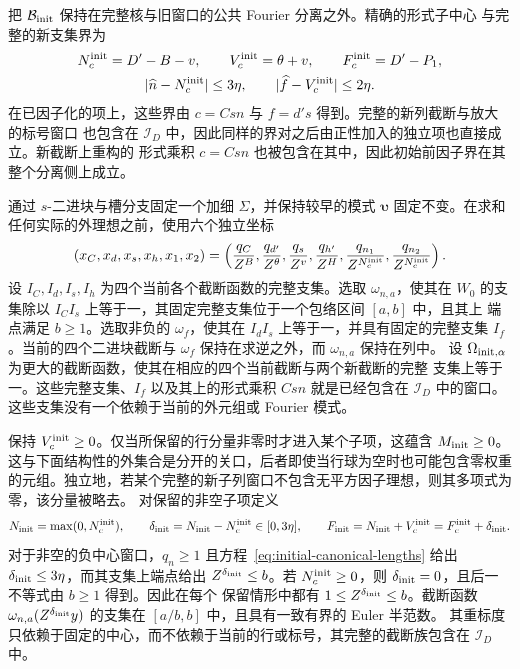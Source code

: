 把 \(\mathcal B_{\rm init}\) 保持在完整核与旧窗口的公共 Fourier 分离之外。精确的形式子中心
与完整的新支集界为
\begin{equation}\label{eq:initial-canonical-lengths}
 \begin{gathered}
 N_c^{\rm init}=D'-B-v,\qquad V_c^{\rm init}=\theta+v,\qquad
 F_c^{\rm init}=D'-P_1,\\
 |\widehat n-N_c^{\rm init}|\le3\eta,\qquad
 |\widehat f-V_c^{\rm init}|\le2\eta.
 \end{gathered}
\end{equation}
在已因子化的项上，这些界由 \(c=Csn\) 与 \(f=d's\) 得到。完整的新列截断与放大的标号窗口
也包含在 \(\mathcal I_D\) 中，因此同样的界对之后由正性加入的独立项也直接成立。新截断上重构的
形式乘积 \(c=Csn\) 也被包含在其中，因此初始前因子界在其整个分离侧上成立。

通过 \(s\)-二进块与槽分支固定一个加细 \(\Sigma\)，并保持较早的模式 \(\boldsymbol\upsilon\)
固定不变。在求和任何实际的外理想之前，使用六个独立坐标
\[
 (x_C,x_d,x_s,x_h,x_1,x_2)
 =\left(\frac{q_C}{Z^B},\frac{q_{d'}}{Z^\theta},
 \frac{q_s}{Z^v},\frac{q_{h'}}{Z^H},
 \frac{q_{n_1}}{Z^{N_c^{\rm init}}},
 \frac{q_{n_2}}{Z^{N_c^{\rm init}}}\right).
\]
设 \(I_C,I_d,I_s,I_h\) 为四个当前各个截断函数的完整支集。选取 \(\omega_{n,a}\)，使其在
\(W_0\) 的支集除以 \(I_CI_s\) 上等于一，其固定完整支集位于一个包络区间 \([a,b]\) 中，且其上
端点满足 \(b\ge1\)。选取非负的 \(\omega_f\)，使其在 \(I_dI_s\) 上等于一，并具有固定的完整支集
\(I_f\)。当前的四个二进块截断与 \(\omega_f\) 保持在求逆之外，而 \(\omega_{n,a}\) 保持在列中。
设 \(\Omega_{{\rm init},\alpha}\) 为更大的截断函数，使其在相应的四个当前截断与两个新截断的完整
支集上等于一。这些完整支集、\(I_f\) 以及其上的形式乘积 \(Csn\) 就是已经包含在 \(\mathcal I_D\)
中的窗口。这些支集没有一个依赖于当前的外元组或 Fourier 模式。

保持 \(V_c^{\rm init}\ge0\)。仅当所保留的行分量非零时才进入某个子项，这蕴含
\(M_{\rm init}\ge0\)。这与下面结构性的外集合是分开的关口，后者即使当行球为空时也可能包含零权重
的元组。独立地，若某个完整的新子列窗口不包含无平方因子理想，则其多项式为零，该分量被略去。
对保留的非空子项定义
\[
 N_{\rm init}=\max(0,N_c^{\rm init}),\qquad
 \delta_{\rm init}=N_{\rm init}-N_c^{\rm init}\in[0,3\eta],\qquad
 F_{\rm init}=N_{\rm init}+V_c^{\rm init}=F_c^{\rm init}+\delta_{\rm init}.
\]
对于非空的负中心窗口，\(q_n\ge1\) 且方程~\eqref{eq:initial-canonical-lengths} 给出
\(\delta_{\rm init}\le3\eta\)，而其支集上端点给出 \(Z^{\delta_{\rm init}}\le b\)。若
\(N_c^{\rm init}\ge0\)，则 \(\delta_{\rm init}=0\)，且后一不等式由 \(b\ge1\) 得到。因此在每个
保留情形中都有 \(1\le Z^{\delta_{\rm init}}\le b\)。截断函数
\(\omega_{n,a}(Z^{\delta_{\rm init}}y)\) 的支集在 \([a/b,b]\) 中，且具有一致有界的 Euler 半范数。
其重标度只依赖于固定的中心，而不依赖于当前的行或标号，其完整的截断族包含在 \(\mathcal I_D\) 中。

